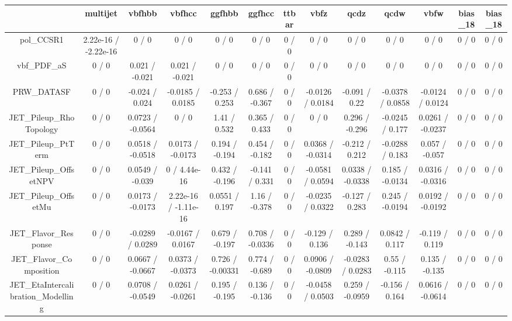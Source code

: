 \documentclass[10pt]{article}
\begin{document}
\begin{table}[htbp]
\begin{center}
\begin{tabular}{|c|c|c|c|c|c|c|c|c|c|c|c|c|}
\hline 
      & multijet      & vbfhbb      & vbfhcc      & ggfhbb      & ggfhcc      & ttbar      & vbfz      & qcdz      & qcdw      & vbfw      & bias_18      & bias_18 \\ 
\hline 
  pol_CCSR1 & 2.22e-16 / -2.22e-16 & 0 / 0 & 0 / 0 & 0 / 0 & 0 / 0 & 0 / 0 & 0 / 0 & 0 / 0 & 0 / 0 & 0 / 0 & 0 / 0 & 0 / 0 \\ 
  vbf_PDF_aS & 0 / 0 & 0.021 / -0.021 & 0.021 / -0.021 & 0 / 0 & 0 / 0 & 0 / 0 & 0 / 0 & 0 / 0 & 0 / 0 & 0 / 0 & 0 / 0 & 0 / 0 \\ 
  PRW_DATASF & 0 / 0 & -0.024 / 0.024 & -0.0185 / 0.0185 & -0.253 / 0.253 & 0.686 / -0.367 & 0 / 0 & -0.0126 / 0.0184 & -0.091 / 0.22 & -0.0378 / 0.0858 & -0.0124 / 0.0124 & 0 / 0 & 0 / 0 \\ 
  JET_Pileup_RhoTopology & 0 / 0 & 0.0723 / -0.0564 & 0 / 0 & 1.41 / 0.532 & 0.365 / 0.433 & 0 / 0 & 0 / 0 & 0.296 / -0.296 & -0.0245 / 0.177 & 0.0261 / -0.0237 & 0 / 0 & 0 / 0 \\ 
  JET_Pileup_PtTerm & 0 / 0 & 0.0518 / -0.0518 & 0.0173 / -0.0173 & 0.194 / -0.194 & 0.454 / -0.182 & 0 / 0 & 0.0368 / -0.0314 & -0.212 / 0.212 & -0.0288 / 0.183 & 0.057 / -0.057 & 0 / 0 & 0 / 0 \\ 
  JET_Pileup_OffsetNPV & 0 / 0 & 0.0549 / -0.039 & 0 / 4.44e-16 & 0.432 / -0.196 & -0.141 / 0.331 & 0 / 0 & -0.0581 / 0.0594 & 0.0338 / -0.0338 & 0.185 / -0.0134 & 0.0316 / -0.0316 & 0 / 0 & 0 / 0 \\ 
  JET_Pileup_OffsetMu & 0 / 0 & 0.0173 / -0.0173 & 2.22e-16 / -1.11e-16 & 0.0551 / 0.197 & 1.16 / -0.378 & 0 / 0 & -0.0235 / 0.0322 & -0.127 / 0.283 & 0.245 / -0.0194 & 0.0192 / -0.0192 & 0 / 0 & 0 / 0 \\ 
  JET_Flavor_Response & 0 / 0 & -0.0289 / 0.0289 & -0.0167 / 0.0167 & 0.679 / -0.197 & 0.708 / -0.0336 & 0 / 0 & -0.129 / 0.136 & 0.289 / -0.143 & 0.0842 / 0.117 & -0.119 / 0.119 & 0 / 0 & 0 / 0 \\ 
  JET_Flavor_Composition & 0 / 0 & 0.0667 / -0.0667 & 0.0373 / -0.0373 & 0.726 / -0.00331 & 0.774 / -0.689 & 0 / 0 & 0.0906 / -0.0809 & -0.0283 / 0.0283 & 0.55 / -0.115 & 0.135 / -0.135 & 0 / 0 & 0 / 0 \\ 
  JET_EtaIntercalibration_Modelling & 0 / 0 & 0.0708 / -0.0549 & 0.0261 / -0.0261 & 0.195 / -0.195 & 0.136 / -0.136 & 0 / 0 & -0.0458 / 0.0503 & 0.259 / -0.0959 & -0.156 / 0.164 & 0.0616 / -0.0614 & 0 / 0 & 0 / 0 \\ 

\end{tabular}
\end{center}
\end{table}
\end{document}
